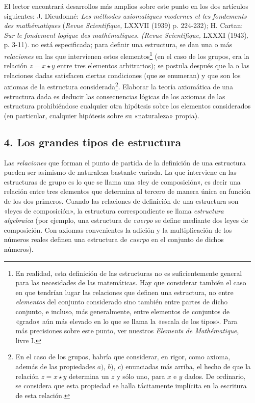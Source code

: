 \documentclass[a4paper, 12pt, draft]{article}
\begin{document}
{ El lector encontrará desarrollos más amplios sobre este punto en los dos artículos siguientes: J. Dieudonné: \textit{Les méthodes axiomatiques modernes et les fondements des mathématiques }(\textit{Revue Scientifique,} LXXVII (1939) p. 224-232); H. Cartan: \textit{Sur le fondement logique des mathématiques. (Revue Scientifique,} LXXXI (1943), p. 3-11).} no está especificada; para definir una estructura, se dan una o más \textit{relaciones} en las que intervienen estos elementos\footnote{En realidad, esta definición de las estructuras no es suficientemente general para las necesidades de las matemáticas. Hay que considerar también el caso en que tendrían lugar las relaciones que definen una estructura, no entre \textit{elementos} del conjunto considerado sino también entre partes de dicho conjunto, e incluso, más generalmente, entre elementos de conjuntos de «grado» aún más elevado en lo que se llama la «escala de los tipos». Para más precisiones sobre este punto, ver nuestros \textit{Elements de Mathématique}, livre I.} (en el caso de los grupos, era la relación $z=x\star y $ entre tres elementos arbitrarios); se postula después que la o las relaciones dadas satisfacen ciertas condiciones (que se enumeran) y que son los axiomas de la estructura considerada\footnote{En el caso de los grupos, habría que considerar, en rigor, como axioma, además de las propiedades $a)$, $b)$, $c)$ enunciadas más arriba, el hecho de que la relación $z =x\star y$ determina un $z$ y sólo uno, para $x$ e $y$ dados. De ordinario, se considera que esta propiedad se halla tácitamente implícita en la escritura de esta relación.}. Elaborar la teoría axiomática de una estructura dada es deducir las consecuencias lógicas de los axiomas de las estructura prohibiéndose cualquier otra hipótesis sobre los elementos considerados (en particular, cualquier hipótesis sobre su «naturaleza» propia).

\subsection*{4. Los grandes tipos de estructura} 

 Las \textit{relaciones} que forman el punto de partida de la definición de una estructura pueden ser asimismo de naturaleza bastante variada. La que interviene en las estructuras de grupo es lo que se llama una «ley de composición», es decir una relación entre tres elementos que determina al tercero de manera única en función de los dos primeros. Cuando las relaciones de definición de una estructura son «leyes de composición», la estructura correspondiente se llama \textit{estructura algebraica} (por ejemplo, una estructura de \textit{cuerpo} se define mediante dos leyes de composición. Con axiomas convenientes la adición y la multiplicación de los números reales definen una estructura de \textit{cuerpo} en el conjunto de dichos números).
\end{document}
